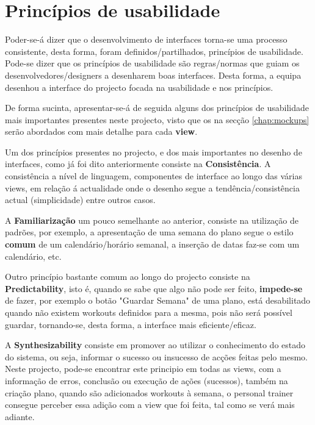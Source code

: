 \section{Princípios de usabilidade}

\hspace{5mm} Poder-se-á dizer que o desenvolvimento de interfaces torna-se uma processo consistente, desta forma, foram definidos/partilhados, princípios de usabilidade. Pode-se dizer que os princípios de usabilidade são regras/normas que guiam os desenvolvedores/designers a desenharem boas interfaces. Desta forma, a equipa desenhou a interface do projecto focada na usabilidade e nos princípios.

\hspace{5mm} De forma sucinta, apresentar-se-á de seguida alguns dos princípios de usabilidade mais importantes presentes neste projecto, visto que os na secção \ref{chap:mockups} serão abordados com mais detalhe para cada \textbf{view}. 

\hspace{5mm} Um dos princípios presentes no projecto, e dos mais importantes no desenho de interfaces, como já foi dito anteriormente consiste na \textbf{Consistência}. A consistência a nível de linguagem, componentes de interface ao longo das várias views, em relação á actualidade onde o desenho segue a tendência/consistência actual (simplicidade) entre outros casos. 

\hspace{5mm} A \textbf{Familiarização} um pouco semelhante ao anterior, consiste na utilização de padrões, por exemplo, a apresentação de uma semana do plano segue o estilo \textbf{comum} de um calendário/horário semanal, a inserção de datas faz-se com um calendário, etc.

\hspace{5mm} Outro princípio bastante comum ao longo do projecto consiste na \textbf{Predictability}, isto é, quando se sabe que algo não pode ser feito, \textbf{impede-se} de fazer, por exemplo o botão "Guardar Semana" de uma plano, está desabilitado quando não existem workouts definidos para a mesma, pois não será possível guardar, tornando-se, desta forma, a interface mais eficiente/eficaz.

\hspace{5mm} A \textbf{Synthesizability} consiste em promover ao utilizar o conhecimento do estado do sistema, ou seja, informar o sucesso ou insucesso de acções feitas pelo mesmo. Neste projecto, pode-se encontrar este principio em todas as views, com a informação de erros, conclusão ou execução de ações (sucessos), também na criação plano, quando são adicionados workouts à semana, o personal trainer consegue perceber essa adição com a view que foi feita, tal como se verá mais adiante.

